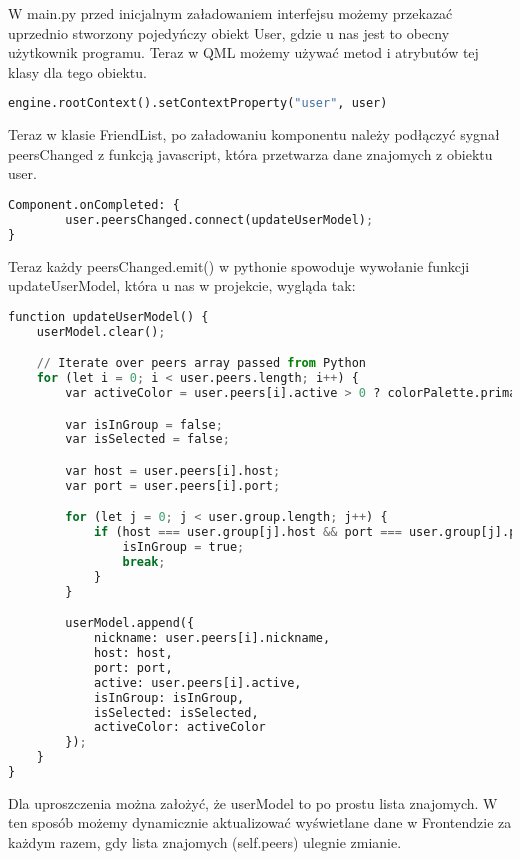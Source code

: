 W main.py przed inicjalnym załadowaniem interfejsu możemy przekazać
uprzednio stworzony pojedyńczy obiekt User, gdzie u nas jest to obecny użytkownik programu. Teraz w QML możemy używać metod i atrybutów tej klasy dla tego obiektu.

\begin{lstlisting}[language=Python, caption={Przekazanie inicjalnego obiektu}]
engine.rootContext().setContextProperty("user", user)
\end{lstlisting}

Teraz w klasie FriendList, po załadowaniu komponentu należy podłączyć sygnał peersChanged z funkcją javascript, która przetwarza dane znajomych z obiektu user.

\begin{lstlisting}[language=Python, caption={Podłączenie sygnału do slota w QML}]
Component.onCompleted: {
        user.peersChanged.connect(updateUserModel);
}
\end{lstlisting}
Teraz każdy peersChanged.emit() w pythonie spowoduje wywołanie funkcji updateUserModel, która u nas w projekcie, wygląda tak:

\begin{lstlisting}[language=Python, caption={Slot w QML obsługujący wyświetlanie zmienionej listy znajomych}]
function updateUserModel() {
    userModel.clear();

    // Iterate over peers array passed from Python
    for (let i = 0; i < user.peers.length; i++) {
        var activeColor = user.peers[i].active > 0 ? colorPalette.primary500 : colorPalette.destructive400

        var isInGroup = false;
        var isSelected = false;

        var host = user.peers[i].host;
        var port = user.peers[i].port;

        for (let j = 0; j < user.group.length; j++) {
            if (host === user.group[j].host && port === user.group[j].port) {
                isInGroup = true;
                break;
            }
        }

        userModel.append({
            nickname: user.peers[i].nickname,
            host: host,
            port: port,
            active: user.peers[i].active,
            isInGroup: isInGroup,
            isSelected: isSelected,
            activeColor: activeColor
        });
    }
}
\end{lstlisting}
Dla uproszczenia można założyć, że userModel to po prostu lista znajomych.
W ten sposób możemy dynamicznie aktualizować wyświetlane dane w Frontendzie za każdym razem, gdy lista znajomych (self.peers) ulegnie zmianie.

